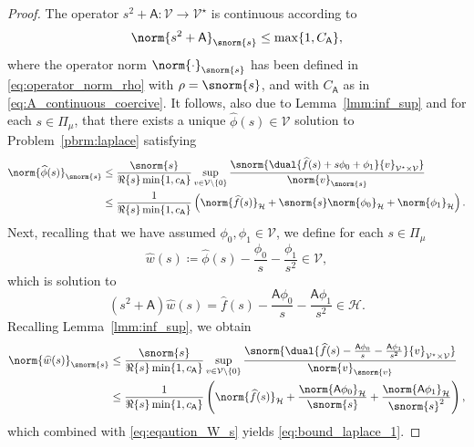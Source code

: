 \begin{proof}
The operator $s^2 +\mathsf{A}: \mathcal{V} \rightarrow \mathcal{V}^\star$
is continuous according to
\begin{equation}
	\norm{s^2 +\mathsf{A}}_{\snorm{s}}
	\leq
	\max \{1,C_{\mathsf{A}} \},
\end{equation}
where the operator norm $\norm{\cdot}_{\snorm{s}}$ has been defined
in \eqref{eq:operator_norm_rho} with $\rho=\snorm{s}$, and with $C_{\mathsf{A}}$ as in \eqref{eq:A_continuous_coercive}.
It follows, also due to Lemma~\ref{lmm:inf_sup} and \cite[Thm. 2.1.44]{sauter2010boundary}
for each $s\in \Pi_\mu$, that there exists a unique
$\widehat{\phi}(s) \in \mathcal{V}$ solution to Problem~\ref{pbrm:laplace} satisfying
\begin{equation}
\begin{aligned}
	\norm{\widehat{\phi}(s)}_{\snorm{s}}
	&
	\leq
	\frac{\snorm{s}}{{\Re\{s\}}\min\{1, c_{\mathsf{A}}\}}
	\sup_{v \in \mathcal{V} \backslash \{0\}}
	\frac{\snorm{\dual{\widehat{f}(s) + s \phi_0 + \phi_1}{v}_{\mathcal{V}^\star \times \mathcal{V}}}}{\norm{v}_{\snorm{s}}}
	\\
	&
	\leq
	\frac{1}{{\Re\{s\}}\min\{1, c_{\mathsf{A}}\}}
	\left(
		\norm{\widehat{f}(s)}_\mathcal{H} + \snorm{s}\norm{\phi_0}_\mathcal{H} + \norm{\phi_1}_\mathcal{H}
	\right).
\end{aligned}
\end{equation}
Next, recalling that we have assumed $\phi_0,\phi_1 \in \mathcal{V}$, we define for each $s \in \Pi_\mu$
\begin{equation}\label{eq:eqaution_W_s}
	\widehat{w}(s) \coloneqq \widehat{\phi}(s) - \frac{\phi_0}{s} -  \frac{\phi_1}{s^2} \in \mathcal{V},
\end{equation}
which is solution to
\begin{equation}
	(s^2 + \mathsf{A})\widehat{w}(s)
	=
    \widehat{f}(s) - \frac{ \mathsf{A} \phi_0}{s} - \frac{ \mathsf{A} \phi_1}{s^2}
    \in \mathcal{H}.
\end{equation}
Recalling Lemma~\ref{lmm:inf_sup}, we obtain
\begin{equation}\label{eq:bound_W_s}
\begin{aligned}
	\norm{\widehat{w}(s)}_{\snorm{s}}
	&
	\leq
	\frac{\snorm{s}}{{\Re\{s\}}\min\{1, c_{\mathsf{A}}\}}
	\sup_{v \in \mathcal{V} \backslash \{0\}}
	\frac{\snorm{\dual{\widehat{f}(s) - \frac{ \mathsf{A} \phi_0}{s} - \frac{ \mathsf{A} \phi_1}{s^2}}{v}_{\mathcal{V}^\star \times \mathcal{V}}}}{\norm{v}_{\snorm{v}}}
	\\
	&
	\leq
	\frac{1}{{\Re\{s\}}\min\{1, c_{\mathsf{A}}\}}
	\left(
		\norm{ \widehat{f}(s) }_\mathcal{H} + \frac{\norm{\mathsf{A} \phi_0}_\mathcal{H}}{\snorm{s}} + \frac{\norm{\mathsf{A} \phi_1}_\mathcal{H}}{\snorm{s}^2} 
	\right),
\end{aligned}
\end{equation}
which combined with \eqref{eq:eqaution_W_s} yields \eqref{eq:bound_laplace_1}.


\end{proof}
